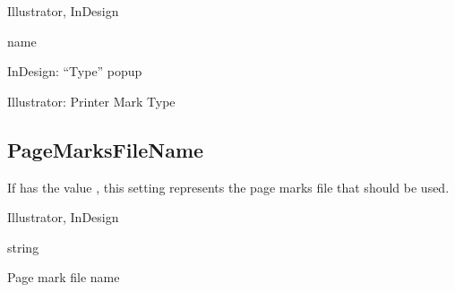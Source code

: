 \documentclass[letterpaper,12pt,english,openany,oneside]{sphinxmanual}
\begin{document}
\label{\detokenize{PDF_Create_NewNamespaces:supported-by-20}}

Illustrator, InDesign

\label{\detokenize{PDF_Create_NewNamespaces:type-20}}

name

\label{\detokenize{PDF_Create_NewNamespaces:ui-name-20}}

InDesign: “Type” pop\sphinxhyphen{}up

Illustrator: Printer Mark Type

\label{\detokenize{PDF_Create_NewNamespaces:default-value-19}}

\begin{sphinxVerbatim}[commandchars=\\\{\}]
\end{sphinxVerbatim}




\subsection{PageMarksFileName}
\label{\detokenize{PDF_Create_NewNamespaces:pagemarksfilename}}
If  has the value  , this setting represents the page marks file that should be used.

\label{\detokenize{PDF_Create_NewNamespaces:supported-by-21}}

Illustrator, InDesign

\label{\detokenize{PDF_Create_NewNamespaces:type-21}}

string

\label{\detokenize{PDF_Create_NewNamespaces:ui-name-21}}

Page mark file name

\label{\detokenize{PDF_Create_NewNamespaces:default-value-20}}

\begin{sphinxVerbatim}[commandchars=\\\{\}]
\end{sphinxVerbatim}
\end{document}
